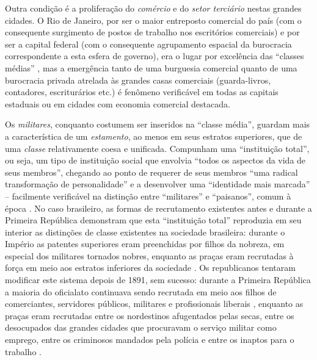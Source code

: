 Outra condição é a proliferação do \textit{comércio} e do \textit{setor terciário} nestas grandes cidades. O Rio de Janeiro, por ser o maior entreposto comercial do país (com o consequente surgimento de postos de trabalho nos escritórios comerciais) e por ser a capital federal (com o consequente agrupamento espacial da burocracia correspondente a esta esfera de governo), era o lugar por excelência das ``classes médias'' \cite[p.~119]{pinheiro_clamed_1977}, mas a emergência tanto de uma burguesia comercial quanto de uma burocracia privada atrelada às grandes casas comerciais (guarda-livros, contadores, escriturários etc.) é fenômeno verificável em todas as capitais estaduais ou em cidades com economia comercial destacada. 

Os \textit{militares}, conquanto costumem ser inseridos na ``classe média'', guardam mais a característica de um \textit{estamento}, ao menos em seus estratos superiores, que de uma \textit{classe} relativamente coesa e unificada. Compunham uma ``instituição total'', ou seja, um tipo de instituição social que envolvia ``todos os aspectos da vida de seus membros'', chegando ao ponto de requerer de seus membros ``uma radical transformação de personalidade'' e a desenvolver uma ``identidade mais marcada'' -- facilmente verificável na distinção entre ``militares'' e ``paisanos'', comum à época \cite[p.~181]{carvalho_militares_1977}. No caso brasileiro, as formas de recrutamento existentes antes e durante a Primeira República demonstram que esta ``instituição total'' reproduzia em seu interior as distinções de classe existentes na sociedade brasileira: durante o Império as patentes superiores eram preenchidas por filhos da nobreza, em especial dos militares tornados nobres, enquanto as praças eram recrutadas à força em meio aos estratos inferiores da sociedade \cite[pp.~186-192]{carvalho_militares_1977}. Os republicanos tentaram modificar este sistema depois de 1891, sem sucesso: durante a Primeira República a maioria do oficialato continuava sendo recrutada em meio aos filhos de comerciantes, servidores públicos, militares e profissionais liberais \cite[p.~188]{carvalho_militares_1977}, enquanto as praças eram recrutadas entre os nordestinos afugentados pelas secas, entre os desocupados das grandes cidades que procuravam o serviço militar como emprego, entre os criminosos mandados pela polícia e entre os inaptos para o trabalho \cite[p.~190]{carvalho_militares_1977}. 

